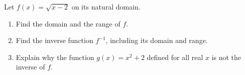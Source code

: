 Let $f(x)=\sqrt{x-2}$ on its natural domain.
\begin{enumerate}
\item[(a)] Find the domain and the range of $f$.
\item[(b)] Find the inverse function $f^{-1}$, including its domain and range.
\item[(c)] Explain why the function $g(x)=x^2+2$ defined for all real $x$ is not the inverse of $f$.
\end{enumerate}

